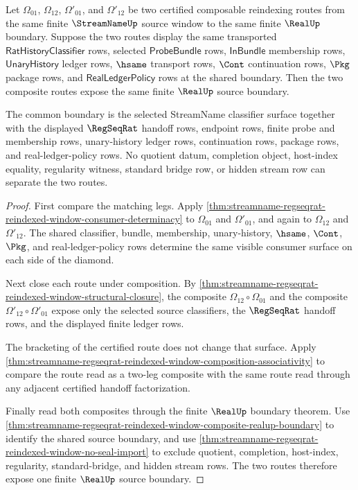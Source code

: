 \begin{theorem}
\label{thm:streamname-regseqrat-reindexed-window-diamond-source-determinacy}
Let $\Omega_{01}$, $\Omega_{12}$, $\Omega'_{01}$, and $\Omega'_{12}$ be two
certified composable reindexing routes from the same finite
$\StreamNameUp$ source window to the same finite $\RealUp$ boundary. Suppose
the two routes display the same transported $\mathsf{RatHistoryClassifier}$
rows, selected $\mathsf{ProbeBundle}$ rows, $\mathsf{InBundle}$ membership
rows, $\mathsf{UnaryHistory}$ ledger rows, $\hsame$ transport rows, $\Cont$
continuation rows, $\Pkg$ package rows, and $\mathsf{RealLedgerPolicy}$ rows at
the shared boundary. Then the two composite routes expose the same finite
$\RealUp$ source boundary.

The common boundary is the selected StreamName classifier surface together
with the displayed $\RegSeqRat$ handoff rows, endpoint rows, finite probe and
membership rows, unary-history ledger rows, continuation rows, package rows,
and real-ledger-policy rows. No quotient datum, completion object, host-index
equality, regularity witness, standard bridge row, or hidden stream row can
separate the two routes.
\end{theorem}
\begin{proof}
First compare the matching legs. Apply
\autoref{thm:streamname-regseqrat-reindexed-window-consumer-determinacy} to
$\Omega_{01}$ and $\Omega'_{01}$, and again to $\Omega_{12}$ and
$\Omega'_{12}$. The shared classifier, bundle, membership, unary-history,
$\hsame$, $\Cont$, $\Pkg$, and real-ledger-policy rows determine the same
visible consumer surface on each side of the diamond.

Next close each route under composition. By
\autoref{thm:streamname-regseqrat-reindexed-window-structural-closure}, the
composite $\Omega_{12}\circ\Omega_{01}$ and the composite
$\Omega'_{12}\circ\Omega'_{01}$ expose only the selected source classifiers,
the $\RegSeqRat$ handoff rows, and the displayed finite ledger rows.

The bracketing of the certified route does not change that surface. Apply
\autoref{thm:streamname-regseqrat-reindexed-window-composition-associativity}
to compare the route read as a two-leg composite with the same route read
through any adjacent certified handoff factorization.

Finally read both composites through the finite $\RealUp$ boundary theorem.
Use
\autoref{thm:streamname-regseqrat-reindexed-window-composite-realup-boundary}
to identify the shared source boundary, and use
\autoref{thm:streamname-regseqrat-reindexed-window-no-seal-import} to exclude
quotient, completion, host-index, regularity, standard-bridge, and hidden
stream rows. The two routes therefore expose one finite $\RealUp$ source
boundary.
\end{proof}

